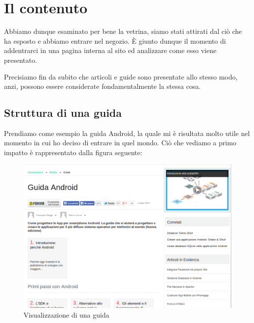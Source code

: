\section{Il contenuto}

Abbiamo dunque esaminato per bene la vetrina, siamo stati attirati dal ciò che ha esposto e abbiamo entrare nel negozio. È giunto dunque il momento di addentrarci in una pagina interna al sito ed analizzare come esso viene presentato.

Precisiamo fin da subito che articoli e guide sono presentate allo stesso modo, anzi, possono essere considerate fondamentalmente la stessa cosa.

\subsection{Struttura di una guida}

Prendiamo come esempio la guida Android, la quale mi è risultata molto utile nel momento in cui ho deciso di entrare in quel mondo. Ciò che vediamo a primo impatto è rappresentato dalla figura seguente:

\begin{figure}[H]
\centering
\includegraphics[width=120mm]{images/internal1.png}
\caption{Visualizzazione di una guida}
\end{figure}

